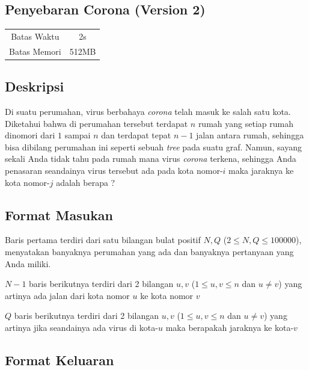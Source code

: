 \documentclass{article}
\begin{document}
\begin{center}
    \section*{Penyebaran Corona (Version 2)} %

    \begin{tabular}{ | c c | }
        \hline
        Batas Waktu  & 2s \\    %
        Batas Memori & 512MB \\  %
        \hline
    \end{tabular}
\end{center}

\subsection*{Deskripsi}

Di suatu perumahan, virus berbahaya \textit{corona} telah masuk ke salah satu kota. Diketahui bahwa di perumahan tersebut terdapat $n$ rumah yang setiap rumah dinomori dari $1$ sampai $n$ dan terdapat tepat $n - 1$ jalan antara rumah, sehingga bisa dibilang perumahan ini seperti sebuah \textit{tree} pada suatu graf. Namun, sayang sekali Anda tidak tahu pada rumah mana virus \textit{corona} terkena, sehingga Anda penasaran seandainya virus tersebut ada pada kota nomor-$i$ maka jaraknya ke kota nomor-$j$ adalah berapa ?

\subsection*{Format Masukan}

Baris pertama terdiri dari satu bilangan bulat positif $N, Q$ ($2 \leq N, Q \leq 100000$), menyatakan banyaknya perumahan yang ada dan banyaknya pertanyaan yang Anda miliki.

$N-1$ baris berikutnya terdiri dari 2 bilangan $u, v$ ($1 \leq u, v \leq n$ dan $u \neq v$) yang artinya ada jalan dari kota nomor $u$ ke kota nomor $v$

$Q$ baris berikutnya terdiri dari 2 bilangan $u, v$ ($1 \leq u, v \leq n$ dan $u \neq v$) yang artinya jika seandainya ada virus di kota-$u$ maka berapakah jaraknya ke kota-$v$

\subsection*{Format Keluaran}
\end{document}
